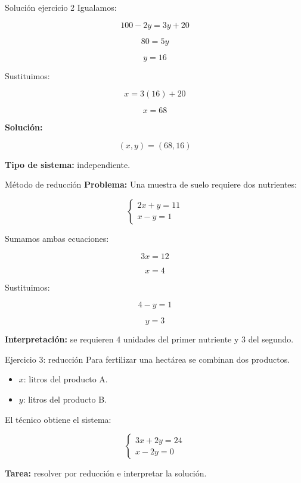 \documentclass{beamer}
\begin{document}
	\begin{frame}{Solución ejercicio 2}
		Igualamos:
		
		\[
		100-2y=3y+20
		\]
		
		\[
		80=5y
		\]
		
		\[
		y=16
		\]
		
		Sustituimos:
		
		\[
		x=3(16)+20
		\]
		
		\[
		x=68
		\]
		
		\bigskip
		
		\textbf{Solución:}
		
		\[
		(x,y)=(68,16)
		\]
		
		\textbf{Tipo de sistema:} independiente.
	\end{frame}
	
	\begin{frame}{Método de reducción}
		\textbf{Problema:}  
		Una muestra de suelo requiere dos nutrientes:
		
		\[
		\begin{cases}
			2x + y = 11 \\
			x - y = 1
		\end{cases}
		\]
		
		Sumamos ambas ecuaciones:
		
		\[
		3x=12
		\]
		
		\[
		x=4
		\]
		
		Sustituimos:
		
		\[
		4-y=1
		\]
		
		\[
		y=3
		\]
		
		\bigskip
		
		\textbf{Interpretación:} se requieren 4 unidades del primer nutriente y 3 del segundo.
	\end{frame}
	
	\begin{frame}{Ejercicio 3: reducción}
		Para fertilizar una hectárea se combinan dos productos.
		
		\begin{itemize}
			\item $x$: litros del producto A.
			\item $y$: litros del producto B.
		\end{itemize}
		
		El técnico obtiene el sistema:
		
		\[
		\begin{cases}
			3x + 2y = 24 \\
			x - 2y = 0
		\end{cases}
		\]
		
		\bigskip
		
		\textbf{Tarea:} resolver por reducción e interpretar la solución.
	\end{frame}
	
\end{document}
